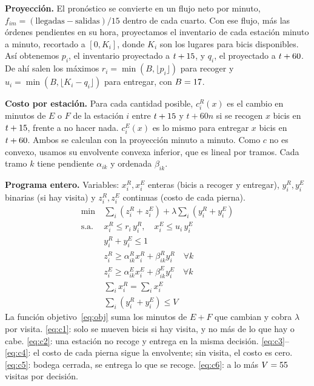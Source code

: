 \documentclass[conference,letterpaper,10pt]{IEEEtran}
\newcommand{\EF}{E+F}
\begin{document}
\textbf{Proyección.} El pronóstico se convierte en un flujo neto por minuto, $f_{im}=(\text{llegadas}-\text{salidas})/15$ dentro de cada cuarto. Con ese flujo, más las órdenes pendientes en su hora, proyectamos el inventario de cada estación minuto a minuto, recortado a $[0,K_i]$, donde $K_i$ son los lugares para bicis disponibles. Así obtenemos $p_i$, el inventario proyectado a $t+15$, y $q_i$, el proyectado a $t+60$. De ahí salen los máximos $r_i=\min(B,\lfloor p_i\rfloor)$ para recoger y $u_i=\min(B,\lfloor K_i-q_i\rfloor)$ para entregar, con $B=17$.

\textbf{Costo por estación.} Para cada cantidad posible, $c^R_i(x)$ es el cambio en minutos de $E$ o $F$ de la estación $i$ entre $t+15$ y $t+60n$ si se recogen $x$ bicis en $t+15$, frente a no hacer nada. $c^E_i(x)$ es lo mismo para entregar $x$ bicis en $t+60$. Ambos se calculan con la proyección minuto a minuto. Como $c$ no es convexo, usamos su envolvente convexa inferior, que es lineal por tramos. Cada tramo $k$ tiene pendiente $\alpha_{ik}$ y ordenada $\beta_{ik}$.

\textbf{Programa entero.} Variables: $x^R_i, x^E_i$ enteras (bicis a recoger y entregar), $y^R_i, y^E_i$ binarias (si hay visita) y $z^R_i, z^E_i$ continuas (costo de cada pierna).
\begin{align}
\min\ & \textstyle\sum_i (z^R_i+z^E_i)+\lambda\sum_i (y^R_i+y^E_i) \label{eq:obj}\\
\text{s.a.}\ & x^R_i\le r_i\,y^R_i,\quad x^E_i\le u_i\,y^E_i \label{eq:c1}\\
& y^R_i+y^E_i\le 1 \label{eq:c2}\\
& z^R_i\ge \alpha^R_{ik}x^R_i+\beta^R_{ik}y^R_i\quad\forall k \label{eq:c3}\\
& z^E_i\ge \alpha^E_{ik}x^E_i+\beta^E_{ik}y^E_i\quad\forall k \label{eq:c4}\\
& \textstyle\sum_i x^R_i=\sum_i x^E_i \label{eq:c5}\\
& \textstyle\sum_i (y^R_i+y^E_i)\le V \label{eq:c6}
\end{align}
La función objetivo~\eqref{eq:obj} suma los minutos de $\EF$ que cambian y cobra $\lambda$ por visita. \eqref{eq:c1}: solo se mueven bicis si hay visita, y no más de lo que hay o cabe. \eqref{eq:c2}: una estación no recoge y entrega en la misma decisión. \eqref{eq:c3}--\eqref{eq:c4}: el costo de cada pierna sigue la envolvente; sin visita, el costo es cero. \eqref{eq:c5}: bodega cerrada, se entrega lo que se recoge. \eqref{eq:c6}: a lo más $V=55$ visitas por decisión.
\end{document}
